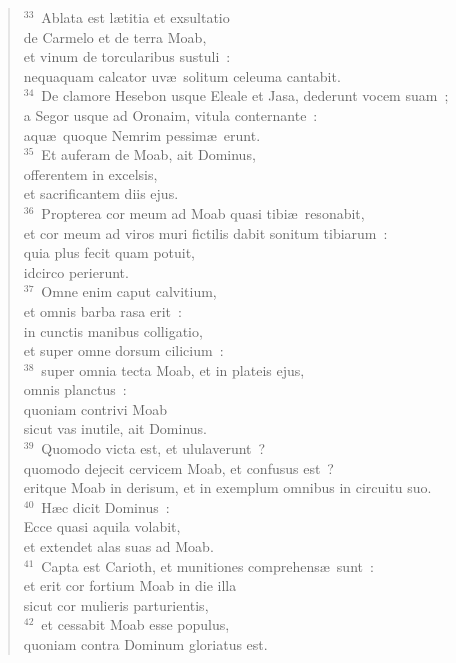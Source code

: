 \begin{flushleft}
\begin{verse}
${}^{33}$~Ablata est l\ae titia et exsultatio\\ de Carmelo et de terra Moab,\\ et vinum de torcularibus sustuli~:\\ nequaquam calcator uv\ae\ solitum celeuma cantabit.\\
${}^{34}$~De clamore Hesebon usque Eleale et Jasa, dederunt vocem suam~;\\ a Segor usque ad Oronaim, vitula conternante~:\\ aqu\ae\ quoque Nemrim pessim\ae\ erunt.\\
${}^{35}$~Et auferam de Moab, ait Dominus,\\ offerentem in excelsis,\\ et sacrificantem diis ejus.\\
${}^{36}$~Propterea cor meum ad Moab quasi tibi\ae\ resonabit,\\ et cor meum ad viros muri fictilis dabit sonitum tibiarum~:\\ quia plus fecit quam potuit,\\ idcirco perierunt.\\
${}^{37}$~Omne enim caput calvitium,\\ et omnis barba rasa erit~:\\ in cunctis manibus colligatio,\\ et super omne dorsum cilicium~:\\
${}^{38}$~super omnia tecta Moab, et in plateis ejus,\\ omnis planctus~:\\ quoniam contrivi Moab\\ sicut vas inutile, ait Dominus.\\
${}^{39}$~Quomodo victa est, et ululaverunt~?\\ quomodo dejecit cervicem Moab, et confusus est~?\\ eritque Moab in derisum, et in exemplum omnibus in circuitu suo.\\
${}^{40}$~H\ae c dicit Dominus~:\\ Ecce quasi aquila volabit,\\ et extendet alas suas ad Moab.\\
${}^{41}$~Capta est Carioth, et munitiones comprehens\ae\ sunt~:\\ et erit cor fortium Moab in die illa\\ sicut cor mulieris parturientis,\\
${}^{42}$~et cessabit Moab esse populus,\\ quoniam contra Dominum gloriatus est.\\

\end{verse}
\end{flushleft}
